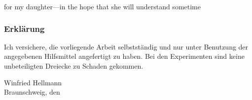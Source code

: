 \documentclass[
	a4paper,
	abstracton,
	bibtotoc,
	english,
  ngerman,
	twoside
] {scrreprt}
\author{\docauthor}
\date{\isodate{\docdate}}
\title{\doctitle}
\renewcommand{\docdate}{2013-08-01}
\theoremstyle{break}
\theoremstyle{nonumberbreak}
\theoremstyle{empty}
\numberwithin{case}{proof}
\begin{document}
\isodate
{}

\maketitle
{}

\thispagestyle{empty}
\vspace*{\fill}
\hspace*{\fill}
for my daughter---in the hope that she will understand sometime
\cleardoublepage

\subsubsection*{\centering Erklärung}
Ich versichere, die vorliegende Arbeit selbstständig und nur unter
Benutzung der angegebenen Hilfsmittel angefertigt zu haben. Bei den
Experimenten sind keine unbeteiligten Dreiecke zu Schaden gekommen.

\vspace{2em}

Winfried Hellmann\hfill\\
Braunschweig, den {\origdate\printdate{\docdate}}
\vspace{5em}
\cleardoublepage

\begin{minipage}{\textwidth}
	\begin{abstract}
	This thesis studies the \gls{MMLT} problem which has recently be proven
	to be NP-hard, which implies that there is no polynomial time algorithm
	for finding an optimal \gls{MMLT} solution unless P\(=\)NP. We verify
	that instances with randomly distributed points can be solved in polynomial
	time on average, however.
	\end{abstract}

	\begin{abstract}
	In dieser Arbeit beschäftigen wir uns mit dem \gls{MMLT} Problem, von
	dem kürzlich bewiesen wurde, dass es NP-schwer ist. Folglich gib es
	keinen Algorithmus, der immer eine optimale \gls{MMLT} Lösung in
	polynomieller Laufzeit findet, es sei denn P\(=\)NP. Wir überprüfen,
	dass Instanzen mit zufällig verteilten Punkten dennoch im Durchschnitt
	in polynomieller Zeit gelöst werden können.
	\end{abstract}
\end{minipage}
\thispagestyle{plain}
\cleardoublepage
\end{document}
